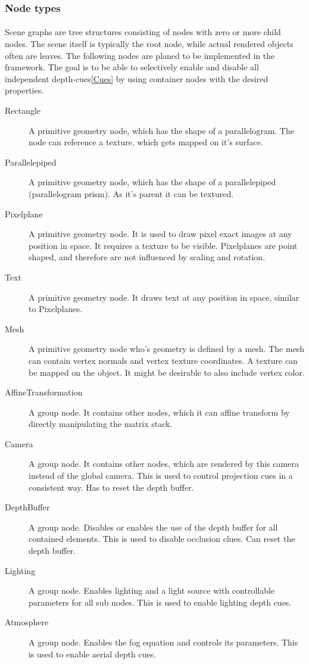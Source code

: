 \subsubsection{Node types}
\paragraph{}
Scene graphs are tree structures consisting of nodes with zero or more child nodes. The scene itself is typically the root node, while actual rendered objects often are leaves. The following nodes are planed to be implemented in the framework.
The goal is to be able to selectively enable and disable all independent depth-cues\ref{Cues} by using container nodes with the desired properties.

\begin{description}
\item[Rectangle] A primitive geometry node, which has the shape of a parallelogram. The node can reference a texture, which gets mapped on it's surface.
\item[Parallelepiped] A primitive geometry node, which has the shape of a parallelepiped (parallelogram prism). As it's parent it can be textured.
\item[Pixelplane] A primitive geometry node. It is used to draw pixel exact images at any position in space. It requires a texture to be visible. Pixelplanes are point shaped, and therefore are not influenced by scaling and rotation.
\item[Text] A primitive geometry node. It draws text at any position in space, similar to Pixelplanes.
\item[Mesh] A primitive geometry node who's geometry is defined by a mesh. The mesh can contain vertex normals and vertex texture coordinates. A texture can be mapped on the object. It might be desirable to also include vertex color.
\item[AffineTransformation] A group  node. It contains other nodes, which it can affine transform by directly manipulating the matrix stack.
\item[Camera] A group node. It contains other nodes, which are rendered by this camera instead of the global camera. This is used to control projection cues in a consistent way. Has to reset the depth buffer.
\item[DepthBuffer] A group node. Disables or enables the use of the depth buffer for all contained elements. This is used to disable occlusion clues. Can reset the depth buffer.
\item[Lighting] A group node. Enables lighting and a light source with controllable parameters for all sub nodes. This is used to enable lighting depth cues.
\item[Atmosphere] A group node. Enables the fog equation and controls its parameters. This is used to enable aerial depth cues.
\end{description}

